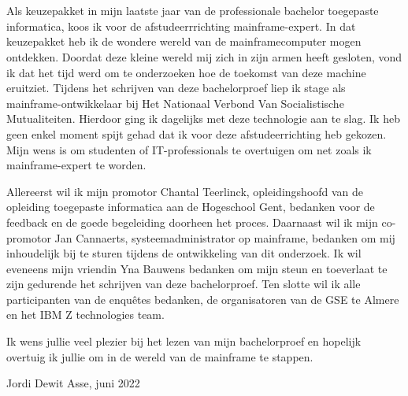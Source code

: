 
\chapter*{}
\label{ch:voorwoord}


Als keuzepakket in mijn laatste jaar van de professionale bachelor toegepaste informatica, koos ik  voor de afstudeerrrichting mainframe-expert. In dat keuzepakket heb ik de wondere wereld van de mainframecomputer mogen ontdekken. Doordat deze kleine wereld mij zich in zijn armen heeft gesloten, vond ik dat het tijd werd om te onderzoeken hoe de toekomst van deze machine eruitziet. Tijdens het schrijven van deze bachelorproef liep ik stage als mainframe-ontwikkelaar bij Het Nationaal Verbond Van Socialistische Mutualiteiten. Hierdoor ging ik dagelijks met deze technologie aan te slag. Ik heb geen enkel moment spijt gehad dat ik voor deze afstudeerrichting heb gekozen. Mijn wens is om studenten of IT-professionals te overtuigen om net zoals ik mainframe-expert te worden. 

Allereerst wil ik mijn promotor Chantal Teerlinck, opleidingshoofd van de opleiding toegepaste informatica aan de Hogeschool Gent, bedanken voor de feedback en de goede begeleiding doorheen het proces. Daarnaast wil ik mijn co-promotor Jan Cannaerts,  systeemadministrator op mainframe, bedanken om mij inhoudelijk bij te sturen tijdens de ontwikkeling van dit onderzoek. Ik wil eveneens mijn vriendin Yna Bauwens bedanken om mijn steun en toeverlaat te zijn gedurende het schrijven van deze bachelorproef. Ten slotte wil ik alle participanten van de enquêtes bedanken, de organisatoren van de GSE te Almere en het IBM Z technologies team. 

Ik wens jullie veel plezier bij het lezen van mijn bachelorproef en hopelijk overtuig ik jullie om in de wereld van de mainframe te stappen. 

Jordi Dewit \newline
Asse, juni 2022